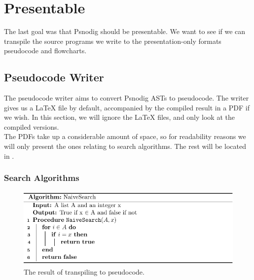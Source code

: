 \section{Presentable}

The last goal was that Psnodig should be presentable. We want to see if we can transpile the source programs we write to the presentation-only formats pseudocode and flowcharts.

\subsection{Pseudocode Writer}

The pseudocode writer aims to convert Psnodig ASTs to pseudocode. The writer gives us a LaTeX file by default, accompanied by the compiled result in a PDF if we wish. In this section, we will ignore the LaTeX files, and only look at the compiled versions. \\

The PDFs take up a considerable amount of space, so for readability reasons we will only present the ones relating to search algorithms. The rest will be located in .

\subsubsection{Search Algorithms}

\begin{figure}[ht!]
    \centering
    \includegraphics[scale=.8]{assets/chapter6/search/NaiveSearch_tbp.pdf}
    \caption{The result of transpiling  to pseudocode.}
    \label{naiveSearchTBP}
\end{figure}

